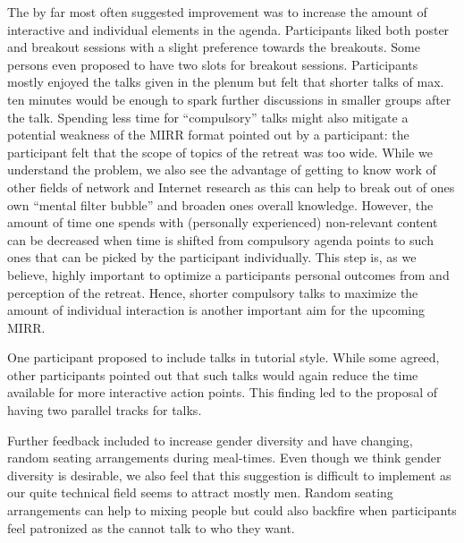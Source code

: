 The by far most often suggested improvement was to increase the amount of interactive and individual elements in the agenda. Participants liked both poster and breakout sessions with a slight preference towards the breakouts. Some persons even proposed to have two slots for breakout sessions. Participants mostly enjoyed the talks given in the plenum but felt that shorter talks of max. ten minutes would be enough to spark further discussions in smaller groups after the talk. Spending less time for ``compulsory'' talks might also mitigate a potential weakness of the MIRR format pointed out by a participant: the participant felt that the scope of topics of the retreat was too wide. While we understand the problem, we also see the advantage of getting to know work of other fields of network and Internet research as this can help to break out of ones own ``mental filter bubble'' and broaden ones overall knowledge. However, the amount of time one spends with (personally experienced) non-relevant content can be decreased when time is shifted from compulsory agenda points to such ones that can be picked by the participant individually. This step is, as we believe, highly important to optimize a participants personal outcomes from and perception of the retreat. Hence, shorter compulsory talks to maximize the amount of individual interaction is another important aim for the upcoming \ac{MIRR}.

One participant proposed to include talks in tutorial style. While some agreed, other participants pointed out that such talks would again reduce the time available for more interactive action points. This finding led to the proposal of having two parallel tracks for talks.

Further feedback included to increase gender diversity and have changing, random seating arrangements during meal-times. Even though we think gender diversity is desirable, we also feel that this suggestion is difficult to implement as our quite technical field seems to attract mostly men. Random seating arrangements can help to mixing people but could also backfire when participants feel patronized as the cannot talk to who they want.
